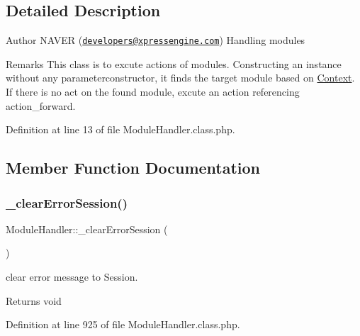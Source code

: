 \subsection{Detailed Description}
\begin{DoxyAuthor}{Author}
N\+A\+V\+ER (\href{mailto:developers@xpressengine.com}{\tt developers@xpressengine.\+com}) Handling modules
\end{DoxyAuthor}
\begin{DoxyRemark}{Remarks}
This class is to excute actions of modules. Constructing an instance without any parameterconstructor, it finds the target module based on \hyperlink{classContext}{Context}. If there is no act on the found module, excute an action referencing action\+\_\+forward. 
\end{DoxyRemark}


Definition at line 13 of file Module\+Handler.\+class.\+php.



\subsection{Member Function Documentation}
\mbox{\label{classModuleHandler_a45c91a72acccf3ee8139538ef5aa1c1d}} 
\subsubsection{\texorpdfstring{\+\_\+clear\+Error\+Session()}{\_clearErrorSession()}}
{\footnotesize\ttfamily Module\+Handler\+::\+\_\+clear\+Error\+Session (\begin{DoxyParamCaption}{ }\end{DoxyParamCaption})}

clear error message to Session. \begin{DoxyReturn}{Returns}
void 
\end{DoxyReturn}


Definition at line 925 of file Module\+Handler.\+class.\+php.

\mbox{\label{classModuleHandler_a75e1eb90149d7f6e38cfd5dc7a9521d4}} 
